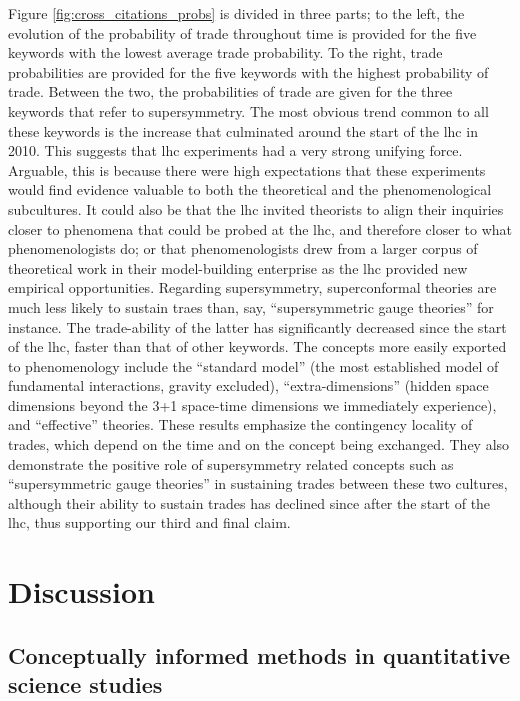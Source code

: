 \documentclass[smallextended]{svjour3}
\begin{document}
Figure \ref{fig:cross_citations_probs} is divided in three parts; to the left, the evolution of the probability of trade throughout time is provided for the five keywords with the lowest average trade probability. To the right, trade probabilities are provided for the five keywords with the highest probability of trade. Between the two, the probabilities of trade are given for the three keywords that refer to supersymmetry. The most obvious trend common to all these keywords is the increase that culminated around the start of the \gls{lhc} in 2010. This suggests that \gls{lhc} experiments had a very strong unifying force. Arguable, this is because there were high expectations that these experiments would find evidence valuable to both the theoretical and the phenomenological subcultures. It could also be that the \gls{lhc} invited theorists to align their inquiries closer to phenomena that could be probed at the \gls{lhc}, and therefore closer to what phenomenologists do; or that phenomenologists drew from a larger corpus of theoretical work in their model-building enterprise as the \gls{lhc} provided new empirical opportunities.  Regarding supersymmetry, superconformal theories are much less likely to sustain traes than, say, ``supersymmetric gauge theories'' for instance. The trade-ability of the latter has significantly decreased since the start of the \gls{lhc}, faster than that of other keywords. The concepts more easily exported to phenomenology include the ``standard model'' (the most established model of fundamental interactions, gravity excluded), ``extra-dimensions'' (hidden space dimensions beyond the 3+1 space-time dimensions we immediately experience), and ``effective'' theories. These results emphasize the contingency locality of trades, which depend on the time and on the concept being exchanged. They also demonstrate the positive role of supersymmetry related concepts such as ``supersymmetric gauge theories'' in sustaining trades between these two cultures, although their ability to sustain trades has declined since after the start of the \gls{lhc}, thus supporting our third and final claim.


\section{\label{section:discussion}Discussion}

\subsection{Conceptually informed methods in quantitative science studies}
\end{document}
